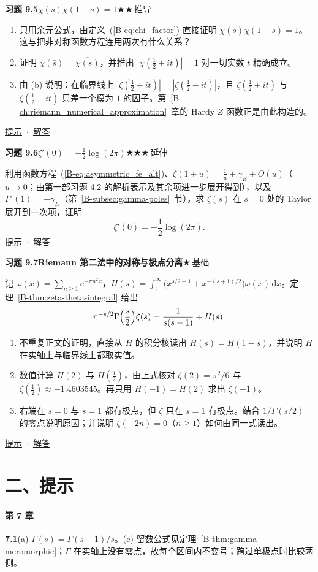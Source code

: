 \documentclass[11pt,a4paper]{article}
\newcommand{\dd}{\,\mathrm{d}}
\newcommand{\bref}[1]{\ref*{B-#1}}
\newcommand{\lvI}{$\bigstar$\,基础}
\newcommand{\lvII}{$\bigstar\bigstar$\,推导}
\newcommand{\lvIII}{$\bigstar\bigstar\bigstar$\,延伸}
\newcommand{\Q}[3]{%
  \par\addvspace{1.1em}\noindent
  \hypertarget{q:#1}{}\textbf{习题 #1}\quad\textbf{#3}\hfill{\small #2}\par
  \nopagebreak\smallskip}
\newcommand{\Hint}[1]{%
  \par\addvspace{0.8em}\noindent
  \hypertarget{h:#1}{}\textbf{#1}\quad{\small（\hyperlink{q:#1}{题目}\ $\cdot$\ \hyperlink{s:#1}{解答}）}\quad}
\newcommand{\toHint}[1]{\hfill{\small\hyperlink{h:#1}{提示}\ $\cdot$\ \hyperlink{s:#1}{解答}}}
\begin{document}
\Q{9.5}{\lvII}{$\chi(s)\chi(1-s)=1$}
\begin{enumerate}
  \item 只用余元公式，由定义~(\bref{eq:chi_factor}) 直接证明 $\chi(s)\chi(1-s)=1$。这与把非对称函数方程连用两次有什么关系？
  \item 证明 $\chi(\bar s)=\overline{\chi(s)}$，并推出 $|\chi(\tfrac12+it)|=1$ 对一切实数 $t$ 精确成立。
  \item 由 (b) 说明：在临界线上 $|\zeta(\tfrac12+it)|=|\zeta(\tfrac12-it)|$，且 $\zeta(\tfrac12+it)$ 与 $\zeta(\tfrac12-it)$ 只差一个模为 $1$ 的因子。第~\bref{ch:riemann_numerical_approximation}~章的 Hardy $Z$ 函数正是由此构造的。
\end{enumerate}
\toHint{9.5}

\Q{9.6}{\lvIII}{$\zeta'(0)=-\tfrac12\log(2\pi)$}
利用函数方程~(\bref{eq:asymmetric_fe_alt})、$\zeta(1+u)=\frac1u+\gamma_E+O(u)$（$u\to0$；由第一部习题 4.2 的解析表示及其余项进一步展开得到），以及 $\Gamma'(1)=-\gamma_E$（第~\bref{subsec:gamma-poles}~节），求 $\zeta(s)$ 在 $s=0$ 处的 Taylor 展开到一次项，证明
\[
  \zeta'(0)=-\frac12\log(2\pi).
\]
\toHint{9.6}

\Q{9.7}{\lvI}{Riemann 第二法中的对称与极点分离}
记 $\omega(x)=\sum_{n\ge1}e^{-\pi n^2x}$，$H(s)=\int_1^\infty\bigl(x^{s/2-1}+x^{-(s+1)/2}\bigr)\omega(x)\dd x$。定理~\bref{thm:zeta-theta-integral} 给出
\[
  \pi^{-s/2}\Gamma\Bigl(\frac s2\Bigr)\zeta(s)=\frac1{s(s-1)}+H(s).
\]
\begin{enumerate}
  \item 不重复正文的证明，直接从 $H$ 的积分核读出 $H(s)=H(1-s)$，并说明 $H$ 在实轴上与临界线上都取实值。
  \item 数值计算 $H(2)$ 与 $H(\tfrac12)$，由上式核对 $\zeta(2)=\pi^2/6$ 与 $\zeta(\tfrac12)\approx-1.4603545$。再只用 $H(-1)=H(2)$ 求出 $\zeta(-1)$。
  \item 右端在 $s=0$ 与 $s=1$ 都有极点，但 $\zeta$ 只在 $s=1$ 有极点。结合 $1/\Gamma(s/2)$ 的零点说明原因；并说明 $\zeta(-2n)=0$（$n\ge1$）如何由同一式读出。
\end{enumerate}
\toHint{9.7}

\newpage
\part*{二、提示}

\subsection*{第 7 章}
\Hint{7.1}(a) $\Gamma(s)=\Gamma(s+1)/s$。(c) 留数公式见定理~\bref{thm:gamma-meromorphic}；$\Gamma$ 在实轴上没有零点，故每个区间内不变号；跨过单极点时比较两侧。
\end{document}
